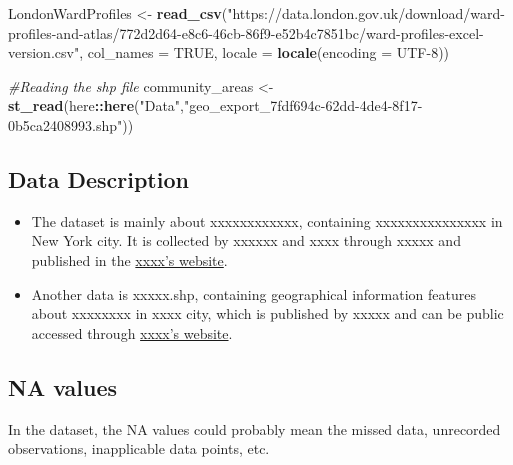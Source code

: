 \documentclass[
]{article}
\newenvironment{Shaded}{\begin{snugshade}}{\end{snugshade}}
\newcommand{\AttributeTok}[1]{\textcolor[rgb]{0.13,0.29,0.53}{#1}}
\newcommand{\CommentTok}[1]{\textcolor[rgb]{0.56,0.35,0.01}{\textit{#1}}}
\newcommand{\ConstantTok}[1]{\textcolor[rgb]{0.56,0.35,0.01}{#1}}
\newcommand{\FunctionTok}[1]{\textcolor[rgb]{0.13,0.29,0.53}{\textbf{#1}}}
\newcommand{\NormalTok}[1]{#1}
\newcommand{\OtherTok}[1]{\textcolor[rgb]{0.56,0.35,0.01}{#1}}
\newcommand{\SpecialCharTok}[1]{\textcolor[rgb]{0.81,0.36,0.00}{\textbf{#1}}}
\newcommand{\StringTok}[1]{\textcolor[rgb]{0.31,0.60,0.02}{#1}}
\providecommand{\tightlist}{%
  \setlength{\itemsep}{0pt}\setlength{\parskip}{0pt}}
\begin{document}
\begin{Shaded}
\begin{Highlighting}[]
\NormalTok{LondonWardProfiles }\OtherTok{\textless{}{-}} \FunctionTok{read\_csv}\NormalTok{(}\StringTok{"https://data.london.gov.uk/download/ward{-}profiles{-}and{-}atlas/772d2d64{-}e8c6{-}46cb{-}86f9{-}e52b4c7851bc/ward{-}profiles{-}excel{-}version.csv"}\NormalTok{, }
                               \AttributeTok{col\_names =} \ConstantTok{TRUE}\NormalTok{, }
                               \AttributeTok{locale =} \FunctionTok{locale}\NormalTok{(}\AttributeTok{encoding =} \StringTok{\textquotesingle{}UTF{-}8\textquotesingle{}}\NormalTok{))}


\CommentTok{\#Reading the shp file}
\NormalTok{community\_areas }\OtherTok{\textless{}{-}} \FunctionTok{st\_read}\NormalTok{(here}\SpecialCharTok{::}\FunctionTok{here}\NormalTok{(}\StringTok{"Data"}\NormalTok{,}\StringTok{"geo\_export\_7fdf694c{-}62dd{-}4de4{-}8f17{-}0b5ca2408993.shp"}\NormalTok{))}
\end{Highlighting}
\end{Shaded}

\hypertarget{data-description}{%
\subsection{Data Description}\label{data-description}}

\begin{itemize}
\tightlist
\item
  The dataset is mainly about xxxxxxxxxxxx, containing xxxxxxxxxxxxxxx
  in New York city. It is collected by xxxxxx and xxxx through xxxxx and
  published in the \href{https://www.openai.com/}{xxxx's website}.
\item
  Another data is xxxxx.shp, containing geographical information
  features about xxxxxxxx in xxxx city, which is published by xxxxx and
  can be public accessed through \href{https://www.openai.com/}{xxxx's
  website}.
\end{itemize}

\hypertarget{na-values}{%
\subsection{NA values}\label{na-values}}

In the dataset, the NA values could probably mean the missed data,
unrecorded observations, inapplicable data points, etc.
\end{document}
